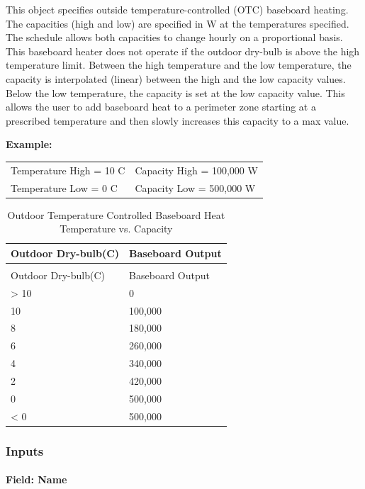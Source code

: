 This object specifies outside temperature-controlled (OTC) baseboard heating. The capacities (high and low) are specified in W at the temperatures specified. The schedule allows both capacities to change hourly on a proportional basis. This baseboard heater does not operate if the outdoor dry-bulb is above the high temperature limit. Between the high temperature and the low temperature, the capacity is interpolated (linear) between the high and the low capacity values. Below the low temperature, the capacity is set at the low capacity value. This allows the user to add baseboard heat to a perimeter zone starting at a prescribed temperature and then slowly increases this capacity to a max value.

\textbf{Example:}

\begin{center}
  \begin{tabular}{@{}ll@{}}
    Temperature High = 10 C & Capacity High = 100,000 W \\
    Temperature Low = 0 C & Capacity Low = 500,000 W
  \end{tabular}
\end{center}

\begin{longtable}[c]{@{}ll@{}}
\caption{Outdoor Temperature Controlled Baseboard Heat Temperature vs. Capacity \label{table:outdoor-temperature-controlled-baseboard-heat}} \tabularnewline
\toprule
Outdoor Dry-bulb(C) & Baseboard Output \tabularnewline
\midrule
\endfirsthead

\caption[]{Outdoor Temperature Controlled Baseboard Heat Temperature vs. Capacity} \tabularnewline
\toprule
Outdoor Dry-bulb(C) & Baseboard Output \tabularnewline
\midrule
\endhead

> 10 & 0 \tabularnewline
10 & 100,000 \tabularnewline
8 & 180,000 \tabularnewline
6 & 260,000 \tabularnewline
4 & 340,000 \tabularnewline
2 & 420,000 \tabularnewline
0 & 500,000 \tabularnewline
< 0 & 500,000 \tabularnewline
\bottomrule
\end{longtable}

\subsubsection{Inputs}\label{inputs-18-003}

\paragraph{Field: Name}\label{field-name-18-003}

